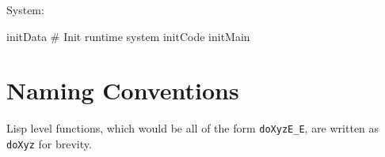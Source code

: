 System:

\begin{wideverbatim}
initData          # Init runtime system
initCode
initMain
\end{wideverbatim}

\section{Naming Conventions}
\label{sec:generic-vm-assembler-naming-conventions}

Lisp level functions, which would be all of the form \texttt{doXyzE\_E}, are
written as \texttt{doXyz} for brevity.
